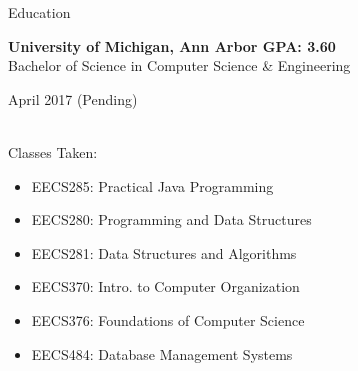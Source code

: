 \documentclass{resume} %
\begin{document}
\bigskip


\begin{rSection}{Education}

{\bf University of Michigan, Ann Arbor \hfill GPA: 3.60 \\}%
Bachelor of Science in Computer Science \& Engineering \hfill \begin{em} April 2017 (Pending) \end{em}\\
Classes Taken:
\vspace{-3mm}
\begin{multicols}{2}
\begin{itemize}[noitemsep,nolistsep]
    \item EECS285: Practical Java Programming
    \item EECS280: Programming and Data Structures
    \item EECS281: Data Structures and Algorithms
    \item EECS370: Intro. to Computer Organization
    \item EECS376: Foundations of Computer Science
    \item EECS484: Database Management Systems
\end{itemize}
\end{multicols}

\end{rSection}

\end{document}
